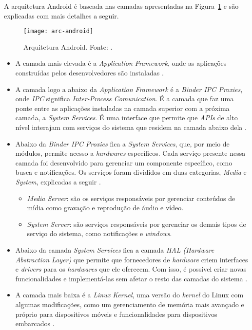 A arquitetura Android é baseada nas camadas apresentadas na Figura~\ref{fig:arc-android} e são explicadas com mais detalhes a seguir.

\begin{figure}[H]
	\centering
	\texttt{[image: arc-android]}
	\caption[Arquitetura Android]{ Arquitetura Android. Fonte: \cite{android_android_2016}.}
	\label{fig:arc-android}
\end{figure}

\begin{itemize}

    \item A camada mais elevada é a \textit{Application Framework}, onde as aplicações construídas pelos desenvolvedores são instaladas \cite{android_android_2016}.
    \item A camada logo a abaixo da \textit{Application Framework} é a \textit{Binder IPC Proxies}, onde \textit{IPC} significa \textit{Inter-Process Comunication}.
    É a camada que faz uma ponte entre as aplicações instaladas na camada superior com a próxima camada, a \textit{System Services}. É uma interface que permite que \textit{APIs}
    de alto nível interajam com serviços do sistema que residem na camada abaixo dela \cite{android_android_2016}. 
    \item Abaixo da \textit{Binder IPC Proxies} fica a \textit{System Services}, que, por meio de módulos, permite acesso a \textit{hardwares} específicos. Cada serviço presente nessa camada
    foi desenvolvido para gerenciar um componente específico, como busca e notificações. Os serviços foram divididos em duas categorias, \textit{Media} e \textit{System}, explicadas a seguir \cite{android_android_2016}.
    \begin{itemize}
        \item \textit{Media Server}: são os serviços responsáveis por gerenciar conteúdos de mídia como gravação e reprodução de áudio e vídeo. 
        \item \textit{System Server}: são serviços responsáveis por gerenciar os demais tipos de serviço do sistema, como notificações e \textit{windows}.
    \end{itemize}
    \item Abaixo da camada \textit{System Services} fica a camada \textit{HAL (Hardware Abstraction Layer)} que permite que fornecedores de \textit{hardware} criem interfaces e \textit{drivers} para os \textit{hardwares} que
    ele oferecem. Com isso, é possível criar novas funcionalidades e implementá-las sem afetar o resto das camadas do sistema \cite{android_android_2016}.  
    \item A camada mais baixa é a \textit{Linux Kernel}, uma versão do \textit{kernel} do Linux com algumas modificações, como um gerenciamento de memória mais avançado e próprio para dispositivos 
    móveis e funcionalidades para dispositivos embarcados \cite{android_android_2016}. 
    
\end{itemize}

